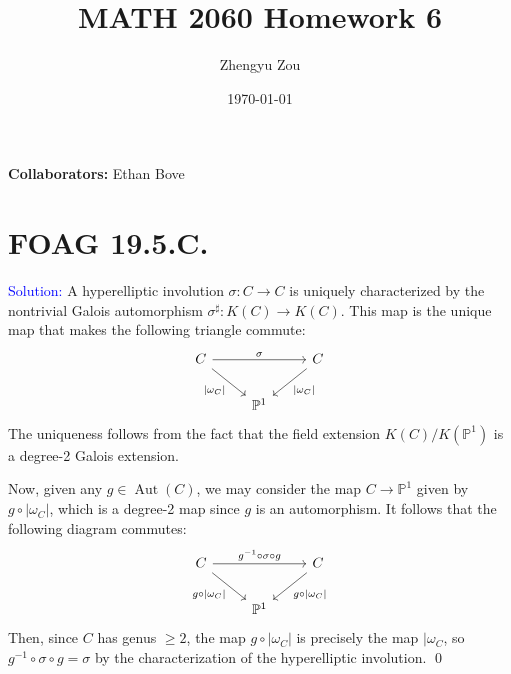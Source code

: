 \documentclass[11pt]{article}
\title{MATH 2060 Homework 6}
\author{Zhengyu Zou}
\date{\today}
\newcommand{\PP}{\mathbb{P}}
\newcommand{\Aut}{\operatorname{Aut}}
\newenvironment{solution}{\begin{trivlist}\item[]{\textcolor{blue}{Solution:}}}{\qed \end{trivlist}}
\begin{document}
\maketitle

\textbf{Collaborators:} Ethan Bove

\section*{FOAG 19.5.C.}

\begin{solution}
    A hyperelliptic involution $\sigma: C \rightarrow C$ is uniquely characterized by the nontrivial Galois automorphism $\sigma^{\sharp}: K(C) \rightarrow K(C)$. This map is the unique map that makes the following triangle commute:
    \[\begin{tikzcd}
        C && C \\
        & {\PP^1}
        \arrow["\sigma", from=1-1, to=1-3]
        \arrow["{|\omega_C|}"', from=1-1, to=2-2]
        \arrow["{|\omega_C|}", from=1-3, to=2-2]
    \end{tikzcd}\]
    The uniqueness follows from the fact that the field extension $K(C) / K(\PP^1)$ is a degree-2 Galois extension. 

    Now, given any $g \in \Aut(C)$, we may consider the map $C \rightarrow \PP^1$ given by $g \circ |\omega_C|$, which is a degree-2 map since $g$ is an automorphism. It follows that the following diagram commutes:
    \[\begin{tikzcd}
        C && C \\
        & {\PP^1}
        \arrow["{g^{-1} \circ \sigma \circ g}", from=1-1, to=1-3]
        \arrow["{g \circ |\omega_C|}"', from=1-1, to=2-2]
        \arrow["{g \circ |\omega_C|}", from=1-3, to=2-2]
    \end{tikzcd}\]
    Then, since $C$ has genus $\geq 2$, the map $g \circ |\omega_C|$ is precisely the map $|\omega_C$, so $g^{-1} \circ \sigma \circ g = \sigma$ by the characterization of the hyperelliptic involution. 
\end{solution}

\newpage
\end{document}
